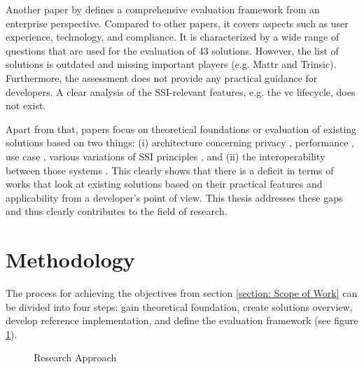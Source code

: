 	Another paper by \cite{kuperberg_blockchain-based_2020} defines a comprehensive evaluation framework from an enterprise perspective. Compared to other papers, it covers aspects such as user experience, technology, and compliance. It is characterized by a wide range of questions that are used for the evaluation of 43 solutions. However, the list of solutions is outdated and missing important players (e.g. Mattr and Trinsic). Furthermore, the assessment does not provide any practical guidance for developers. A clear analysis of the \ac{SSI}-relevant features, e.g. the \ac{vc} lifecycle, does not exist. 
	
	Apart from that, papers focus on theoretical foundations or evaluation of existing solutions based on two things: (i) architecture \cite{gruner_relevance_2018} concerning privacy \cite{bernabe_privacy-preserving_2019}, performance \cite{bouras_distributed_2020}, use case \cite{kuperberg_blockchain-based_2020}, various variations of \ac{SSI} principles \cite{allen_path_2016, allende_lopez_self-sovereign_2020, sporny_decentralized_2021, bouras_distributed_2020, cameron_laws_2005, dib_decentralized_2020, dunphy_first_2018, ferdous_search_2019, friedewald_self-sovereign_2020, van_bokkem_self-sovereign_2019}, and (ii) the interoperability between those systems \cite{homeland_security_preventing_2020, john_dhs_2020}. This clearly shows that there is a deficit in terms of works that look at existing solutions based on their practical features and applicability from a developer's point of view. This thesis addresses these gaps and thus clearly contributes to the field of research.
	
	\section{Methodology} %
    The process for achieving the objectives from section \ref{section: Scope of Work} can be divided into four steps: gain theoretical foundation, create solutions overview, develop reference implementation, and define the evaluation framework (see figure \ref{figure: approach}).
    
    \begin{figure}[ht]
	    \centering
        \caption{Research Approach}
        \label{figure: approach}
    \end{figure}
	
